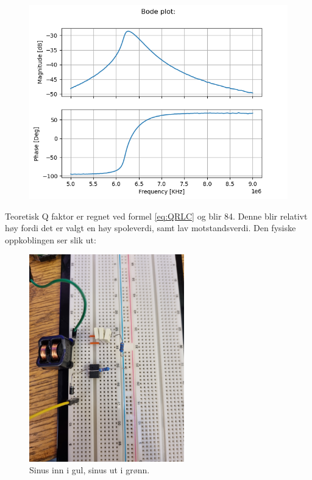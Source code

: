 \documentclass[a4paper,11pt,norsk]{article}
\begin{document}
\begin{figure}[H]
  \centering
  \includegraphics[width=1\textwidth]{Figure_1.png} 
  \caption{}
  \label{fig:bode}
\end{figure}

Teoretisk Q faktor er regnet ved formel \ref{eq:QRLC} og blir 84. Denne blir relativt høy fordi det er valgt en høy spoleverdi, samt lav motstandsverdi. Den fysiske oppkoblingen ser slik ut:

\begin{figure}[H]
  \centering
  \includegraphics[width=0.6\textwidth]{20220322_193442.jpg} 
  \caption{Sinus inn i gul, sinus ut i grønn.}
  \label{fig:Fysisk}
\end{figure}
\end{document}
